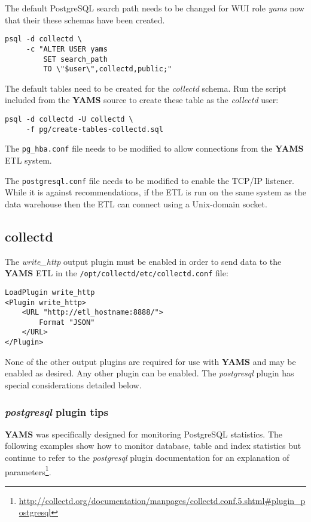 \documentclass[a4paper,twoside,12pt]{article}
\begin{document}
The default PostgreSQL search path needs to be changed for WUI role
\textit{yams} now that their these schemas have been created.
\lstset{language=sh}
\begin{lstlisting}
psql -d collectd \
     -c "ALTER USER yams
         SET search_path
         TO \"$user\",collectd,public;"
\end{lstlisting}

The default tables need to be created for the \textit{collectd} schema.  Run
the script included from the \textbf{YAMS} source to create these table as the
\textit{collectd} user:
\lstset{language=sh}
\begin{lstlisting}
psql -d collectd -U collectd \
     -f pg/create-tables-collectd.sql
\end{lstlisting}

The \texttt{pg\_hba.conf} file needs to be modified to allow connections from
the \textbf{YAMS} ETL system.

The \texttt{postgresql.conf} file needs to be modified to enable the TCP/IP
listener.  While it is against recommendations, if the ETL is run on the same
system as the data warehouse then the ETL can connect using a Unix-domain
socket.

\subsection{collectd}

The \textit{write\_http} output plugin must be enabled in order to send data to
the \textbf{YAMS} ETL in the \texttt{/opt/collectd/etc/collectd.conf} file:
\lstset{language=xml}
\begin{lstlisting}
LoadPlugin write_http
<Plugin write_http>
    <URL "http://etl_hostname:8888/">
        Format "JSON"
    </URL>
</Plugin>
\end{lstlisting}

None of the other output plugins are required for use with \textbf{YAMS} and
may be enabled as desired.  Any other plugin can be enabled.  The
\textit{postgresql} plugin has special considerations detailed below.

\subsubsection{\textit{postgresql} plugin tips}

\textbf{YAMS} was specifically designed for monitoring PostgreSQL statistics.
The following examples show how to monitor database, table and index
statistics but continue to refer to the \textit{postgresql} plugin
documentation for an explanation of
parameters\footnote{\url{http://collectd.org/documentation/manpages/collectd.conf.5.shtml#plugin_postgresql}}.
\end{document}
